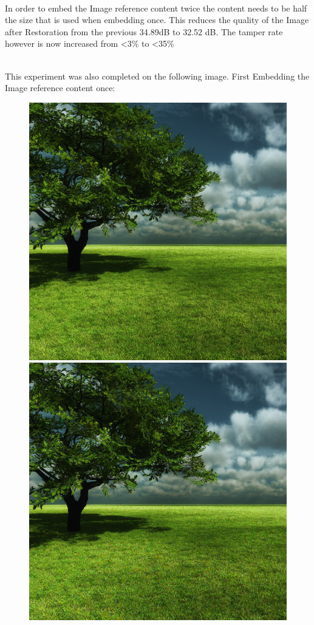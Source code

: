 \documentclass[12pt]{article}
\begin{document}
\hspace{0pt} \\
In order to embed the Image reference content twice the content needs to be half the size that is used when embedding once.
This reduces the quality of the Image after Restoration from the previous 34.89dB to 32.52 dB.
The tamper rate however is now increased from \textless 3\% to \textless 35\%

\hspace{0pt} \\
This experiment was also completed on the following image.
First Embedding the Image reference content once:

\begin{figure}[h]
\centerline{%
\includegraphics[scale=0.3375]{"tree"}%
\hspace{0.1cm}
\includegraphics[scale=0.45]{"Tree Embed once 0.8 threshold/finalImage"}%
}
\end{figure}
\end{document}

